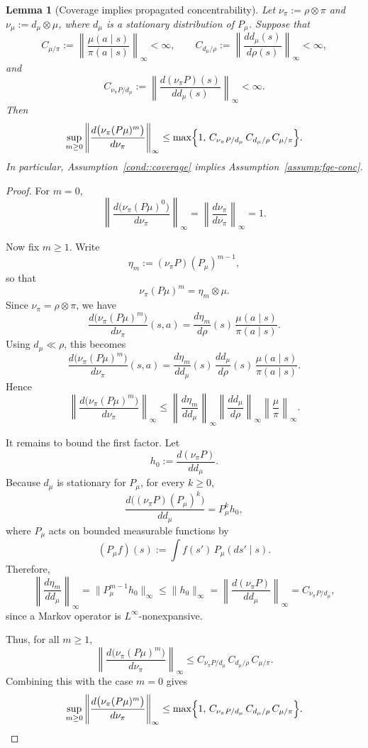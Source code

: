 \documentclass{article}
\newtheorem{lemma}{Lemma}
\newcommand{\1}{\mathbbm{1}}
\begin{document}
\begin{lemma}[Coverage implies propagated concentrability]
\label{lem:coverage-implies-conc}
Let \(\nu_\pi:=\rho\otimes \pi\) and \(\nu_\mu:=d_\mu\otimes \mu\), where
\(d_\mu\) is a stationary distribution of \(P_\mu\). Suppose that
\[
C_{\mu/\pi}
:=
\left\|
\frac{\mu(a\mid s)}{\pi(a\mid s)}
\right\|_\infty
<\infty,
\qquad
C_{d_\mu/\rho}
:=
\left\|
\frac{d d_\mu(s)}{d\rho(s)}
\right\|_\infty
<\infty,
\]
and
\[
C_{\nu_\pi P/d_\mu}
:=
\left\|
\frac{d(\nu_\pi P)(s)}{d d_\mu(s)}
\right\|_\infty
<\infty.
\]
Then
\[
\sup_{m\ge 0}
\left\|
\frac{d\bigl(\nu_\pi (P\mu)^m\bigr)}{d\nu_\pi}
\right\|_\infty
\le
\max\Bigl\{
1,\,
C_{\nu_\pi P/d_\mu}\,C_{d_\mu/\rho}\,C_{\mu/\pi}
\Bigr\}.
\]
In particular, Assumption~\ref{cond::coverage} implies
Assumption~\ref{assump:fqe-conc}.
\end{lemma}

\begin{proof}
For \(m=0\),
\[
\left\|
\frac{d\bigl(\nu_\pi (P\mu)^0\bigr)}{d\nu_\pi}
\right\|_\infty
=
\left\|
\frac{d\nu_\pi}{d\nu_\pi}
\right\|_\infty
=
1.
\]

Now fix \(m\ge 1\). Write
\[
\eta_m:= (\nu_\pi P)(P_\mu)^{m-1},
\]
so that
\[
\nu_\pi (P\mu)^m = \eta_m \otimes \mu.
\]
Since \(\nu_\pi=\rho\otimes\pi\), we have
\[
\frac{d\bigl(\nu_\pi (P\mu)^m\bigr)}{d\nu_\pi}(s,a)
=
\frac{d\eta_m}{d\rho}(s)\,
\frac{\mu(a\mid s)}{\pi(a\mid s)}.
\]
Using \(d_\mu\ll \rho\), this becomes
\[
\frac{d\bigl(\nu_\pi (P\mu)^m\bigr)}{d\nu_\pi}(s,a)
=
\frac{d\eta_m}{d d_\mu}(s)\,
\frac{d d_\mu}{d\rho}(s)\,
\frac{\mu(a\mid s)}{\pi(a\mid s)}.
\]
Hence
\[
\left\|
\frac{d\bigl(\nu_\pi (P\mu)^m\bigr)}{d\nu_\pi}
\right\|_\infty
\le
\left\|
\frac{d\eta_m}{d d_\mu}
\right\|_\infty
\left\|
\frac{d d_\mu}{d\rho}
\right\|_\infty
\left\|
\frac{\mu}{\pi}
\right\|_\infty.
\]

It remains to bound the first factor. Let
\[
h_0:=\frac{d(\nu_\pi P)}{d d_\mu}.
\]
Because \(d_\mu\) is stationary for \(P_\mu\), for every \(k\ge 0\),
\[
\frac{d\bigl((\nu_\pi P)(P_\mu)^k\bigr)}{d d_\mu}
=
P_\mu^k h_0,
\]
where \(P_\mu\) acts on bounded measurable functions by
\[
(P_\mu f)(s):=\int f(s')\,P_\mu(ds'\mid s).
\]
Therefore,
\[
\left\|
\frac{d\eta_m}{d d_\mu}
\right\|_\infty
=
\|P_\mu^{m-1} h_0\|_\infty
\le
\|h_0\|_\infty
=
\left\|
\frac{d(\nu_\pi P)}{d d_\mu}
\right\|_\infty
=
C_{\nu_\pi P/d_\mu},
\]
since a Markov operator is \(L^\infty\)-nonexpansive.

Thus, for all \(m\ge 1\),
\[
\left\|
\frac{d\bigl(\nu_\pi (P\mu)^m\bigr)}{d\nu_\pi}
\right\|_\infty
\le
C_{\nu_\pi P/d_\mu}\,
C_{d_\mu/\rho}\,
C_{\mu/\pi}.
\]
Combining this with the case \(m=0\) gives
\[
\sup_{m\ge 0}
\left\|
\frac{d\bigl(\nu_\pi (P\mu)^m\bigr)}{d\nu_\pi}
\right\|_\infty
\le
\max\Bigl\{
1,\,
C_{\nu_\pi P/d_\mu}\,C_{d_\mu/\rho}\,C_{\mu/\pi}
\Bigr\}.
\]
\end{proof}
\end{document}
